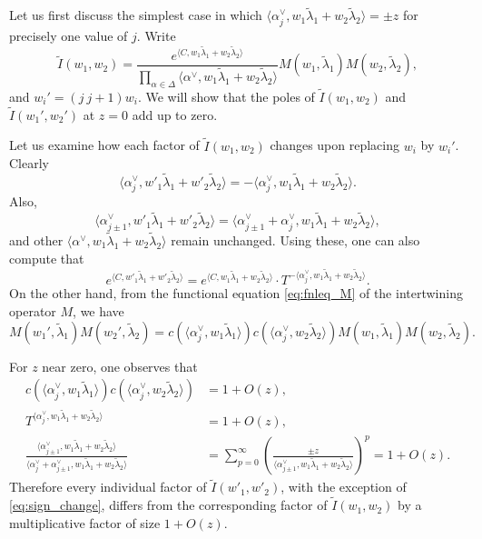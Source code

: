 \documentclass[11pt]{amsart}
\numberwithin{theorem}{section}
\numberwithin{equation}{section}
\theoremstyle{remark}
\theoremstyle{definition}
\begin{document}
Let us first discuss the simplest case in which $\langle \alpha_j^\vee,w_1\tilde\lambda_1+w_2\tilde\lambda_2\rangle = \pm z$ for precisely one value of $j$. Write
\begin{equation} \label{eq:summand}
\tilde I(w_1,w_2) = \frac{e^{\langle C, w_1\tilde\lambda_1+w_2\tilde\lambda_2 \rangle}}{\prod_{\alpha \in \Delta}\langle \alpha^\vee, w_1\tilde\lambda_1 + w_2\tilde\lambda_2 \rangle} M(w_1,\tilde\lambda_1)M(w_2,\tilde\lambda_2),
\end{equation}
and $w_i' = (j\ j+1)w_i$. We will show that the poles of $\tilde I(w_1,w_2)$ and $\tilde I(w_1',w_2')$ at $z=0$ add up to zero.

Let us examine how each factor of $\tilde I(w_1,w_2)$ changes upon replacing $w_i$ by $w_i'$. Clearly
\begin{equation} \label{eq:sign_change}
\langle \alpha^\vee_j, w'_1\tilde\lambda_1+w'_2\tilde\lambda_2\rangle = - \langle \alpha^\vee_j, w_1\tilde\lambda_1+w_2\tilde\lambda_2\rangle .
\end{equation}
Also,
\begin{equation*}
\langle \alpha^\vee_{j\pm1}, w'_1\tilde\lambda_1+w'_2\tilde\lambda_2\rangle = \langle \alpha^\vee_{j\pm1} + \alpha^\vee_j, w_1\tilde\lambda_1+w_2\tilde\lambda_2\rangle,
\end{equation*}
and other $\langle \alpha^\vee, w_1\tilde\lambda_1+w_2\tilde\lambda_2\rangle$ remain unchanged. Using these, one can also compute that
\begin{equation*}
e^{\langle C, w'_1\tilde\lambda_1+w'_2\tilde\lambda_2\rangle} = e^{\langle C, w_1\tilde\lambda_1+w_2\tilde\lambda_2\rangle}\cdot T^{-\langle \alpha^\vee_{j}, w_1\tilde\lambda_1+w_2\tilde\lambda_2\rangle}.
\end{equation*}
On the other hand, from the functional equation \eqref{eq:fnleq_M} of the intertwining operator $M$, we have
\begin{equation*}
M(w_1',\tilde\lambda_1)M(w_2',\tilde\lambda_2) = c(\langle\alpha^\vee_j,w_1\tilde\lambda_1\rangle)c(\langle\alpha^\vee_j,w_2\tilde\lambda_2\rangle)M(w_1,\tilde\lambda_1)M(w_2,\tilde\lambda_2).
\end{equation*}

For $z$ near zero, one observes that
\begin{align*}
c(\langle \alpha^\vee_{j},w_1\tilde\lambda_1\rangle)c(\langle \alpha^\vee_{j},w_2\tilde\lambda_2\rangle) &= 1+O(z),\\
T^{\langle \alpha^\vee_{j},w_1\tilde\lambda_1+w_2\tilde\lambda_2\rangle} &= 1+O(z), \\
\frac{\langle \alpha^\vee_{j\pm1},w_1\tilde\lambda_1+w_2\tilde\lambda_2\rangle}{\langle \alpha^\vee_{j}+\alpha^\vee_{j\pm1}, w_1\tilde\lambda_1+w_2\tilde\lambda_2\rangle} &= \sum_{p=0}^\infty\left(\frac{\pm z}{\langle \alpha^\vee_{j\pm1},w_1\tilde\lambda_1+w_2\tilde\lambda_2\rangle}\right)^p = 1+O(z).
\end{align*}
Therefore every individual factor of $\tilde I(w'_1,w'_2)$, with the exception of \eqref{eq:sign_change}, differs from the corresponding factor of $\tilde I(w_1,w_2)$ by a multiplicative factor of size $1+O(z)$.
\end{document}
